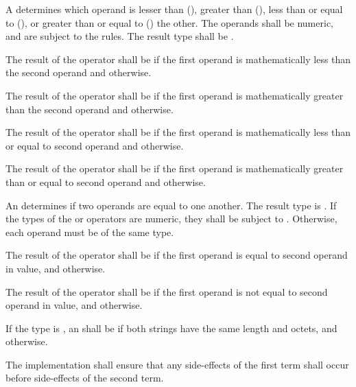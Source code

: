 \specsubsubitem
A  determines which operand is lesser than
(\terminal{<}), greater than (\terminal{>}), less than or equal to
(\terminal{<=}), or greater than or equal to (\terminal{>=}) the other. The
operands shall be numeric, and are subject to the 
rules.  The result type shall be .

\specsubsubitem
The result of the \terminal{<} operator shall be  if the first
operand is mathematically less than the second operand and 
otherwise.

\specsubsubitem
The result of the \terminal{>} operator shall be  if the first
operand is mathematically greater than the second operand and 
otherwise.

\specsubsubitem
The result of the \terminal{<=} operator shall be  if the
first operand is mathematically less than or equal to second operand
and  otherwise.

\specsubsubitem
The result of the \terminal{>=} operator shall be  if the first
operand is mathematically greater than or equal to second operand
and  otherwise.

\specsubsubitem
An  determines if two operands are equal to one
another. The result type is . If the types of the \terminal{==}
or \terminal{!=} operators are numeric, they shall be subject to
. Otherwise, each operand must be of the same type.

\specsubsubitem
The result of the \terminal{==} operator shall be  if the first
operand is equal to second operand in value, and  otherwise.

\specsubsubitem
The result of the \terminal{!=} operator shall be  if the first
operand is not equal to second operand in value, and  otherwise.

\specsubsubitem
If the type is , an  shall be
 if both strings have the same length and octets, and
 otherwise.

\specsubsubitem
The implementation shall ensure that any side-effects of the first term shall
occur before side-effects of the second term.


